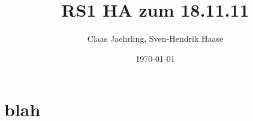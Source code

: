\documentclass[12pt]{article}
\author{Claas Jaehrling, Sven-Hendrik Haase}
\title{RS1 HA zum 18.11.11}
\date{\today}
\begin{document}
\maketitle

\section{blah}
\end{document}
